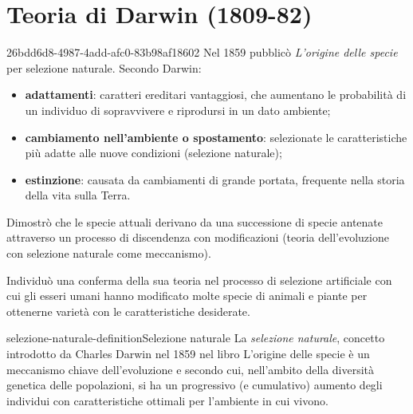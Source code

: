 \documentclass[preview]{standalone}
\begin{document}
\section{Teoria di Darwin (1809-82)}

\begin{snippet}{26bdd6d8-4987-4add-afc0-83b98af18602}
    Nel 1859 pubblicò \textit{L'origine delle specie} per selezione naturale.
    Secondo Darwin:
    \begin{itemize}
        \item \textbf{adattamenti}: caratteri ereditari vantaggiosi, che aumentano le
            probabilità di un individuo di sopravvivere e riprodursi in un dato
            ambiente;
        \item \textbf{cambiamento nell'ambiente o spostamento}: selezionate le
        caratteristiche più adatte alle nuove condizioni (selezione naturale);
        \item \textbf{estinzione}: causata da cambiamenti di grande portata, frequente nella
        storia della vita sulla Terra.
    \end{itemize}

    Dimostrò che le specie attuali derivano da una successione di specie
    antenate attraverso un processo di discendenza con modificazioni
    (teoria dell'evoluzione con selezione naturale come meccanismo).

    Individuò una conferma della sua teoria nel processo di selezione
    artificiale con cui gli esseri umani hanno modificato molte specie di
    animali e piante per ottenerne varietà con le caratteristiche desiderate.
\end{snippet}

\begin{snippetdefinition}{selezione-naturale-definition}{Selezione naturale}
    La \textit{selezione naturale}, concetto introdotto da Charles Darwin
    nel 1859 nel libro L'origine delle specie è un meccanismo chiave dell'evoluzione
    e secondo cui, nell'ambito della diversità genetica delle popolazioni,
    si ha un progressivo (e cumulativo) aumento degli individui con caratteristiche
    ottimali per l'ambiente in cui vivono.
\end{snippetdefinition}
\end{document}
